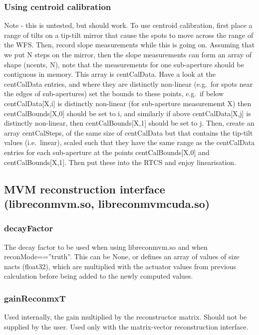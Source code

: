 \documentclass[a4,10pt]{article}
\begin{document}
\subsubsection{Using centroid calibration}
Note - this is untested, but should work.  To use centroid
calibration, first place a range of tilts on a tip-tilt mirror that
cause the spots to move across the range of the WFS.  Then, record
slope measurements while this is going on.  Assuming that we put N
steps on the mirror, then the slope measurements can form an array of
shape (ncents, N), note that the measurements for one sub-aperture
should be contiguous in memory.  This array is centCalData.  Have a
look at the centCalData entries, and where they are distinctly
non-linear (e.g.\ for spots near the edges of sub-apertures) set the
bounds to these points, e.g.\ if below centCalData[X,i] is distinctly
non-linear (for sub-aperture measurememt X) then centCalBounds[X,0]
should be set to i, and similarly if above centCalData[X,j] is
distinctly non-linear, then centCalBounds[X,1] should be set to j.
Then, create an array centCalSteps, of the same size of centCalData
but that contains the tip-tilt values (i.e.\ linear), scaled such that
they have the same range as the centCalData entries for each
sub-aperture at the points centCalBounds[X,0] and centCalBounds[X,1].
Then put these into the RTCS and enjoy linearisation.



\subsection{MVM reconstruction interface (libreconmvm.so, libreconmvmcuda.so)}
\subsubsection{decayFactor}
The decay factor to be used when using libreconmvm.so and when
reconMode==''truth''.  This can be None, or defines an array of values
of size nacts (float32), which are multiplied with the actuator values from
previous calculation before being added to the newly computed values.

\subsubsection{gainReconmxT}
Used internally, the gain multiplied by the reconstructor matrix.
Should not be supplied by the user.  Used only with the matrix-vector
reconstruction interface.
\end{document}
